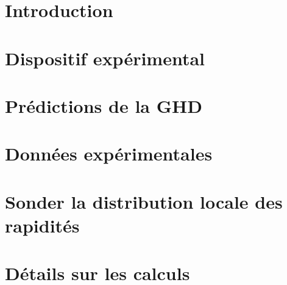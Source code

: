 \def\relativepath{BiPart/} %

\graphicspath{{\relativepath Figures/}} %
\makeatletter
\def\inputfile#1{} %
\makeatother






\section*{Introduction}\inputfile{sections/intro}

\section{Dispositif expérimental}\inputfile{sections/disp_exp}




\section{Prédictions de la GHD}
\inputfile{sections/predic_GHD}

\section{Données expérimentales}
\inputfile{sections/don_exp}

\section{Sonder la distribution locale des rapidités}
\inputfile{sections/Sonder_local}

\section{Détails sur les calculs}
\inputfile{sections/calculs}

 





